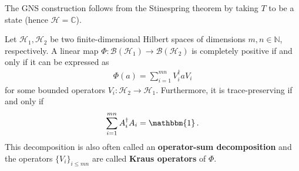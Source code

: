     \begin{result}
        The GNS construction follows from the Stinespring theorem by taking $T$ to be a state (hence $\mathcal{H}=\mathbb{C}$).
    \end{result}

    \begin{result}[Choi]
        Let $\mathcal{H}_1,\mathcal{H}_2$ be two finite-dimensional Hilbert spaces of dimensions $m,n\in\mathbb{N}$, respectively. A linear map $\Phi:\mathcal{B}(\mathcal{H}_1)\rightarrow\mathcal{B}(\mathcal{H}_2)$ is completely positive if and only if it can be expressed as
        \begin{gather}
            \Phi(a) = \sum_{i=1}^{mn}V^\dagger_iaV_i
        \end{gather}
        for some bounded operators $V_i:\mathcal{H}_2\rightarrow\mathcal{H}_1$. Furthermore, it is trace-preserving if and only if
        \begin{gather}
            \sum_{i=1}^{mn}A^\dag_iA_i = \mathbbm{1}\,.
        \end{gather}
        This decomposition is also often called an \textbf{operator-sum decomposition} and the operators $\{V_i\}_{i\leq mn}$ are called \textbf{Kraus operators} of $\Phi$.
    \end{result}

\subsection{}

